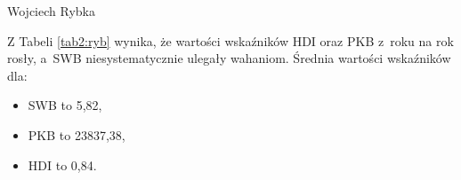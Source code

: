 \begin{artplenv}{Wojciech Rybka}
%
%

Z Tabeli \ref{tab2:ryb} wynika, że wartości wskaźników HDI oraz PKB z~roku na rok rosły, a~SWB niesystematycznie ulegały wahaniom.
Średnia wartości wskaźników dla:

\begin{itemize}
\item SWB to 5,82, 
\item PKB to 23837,38, 
\item HDI to 0,84.
\end{itemize}



\end{artplenv}
